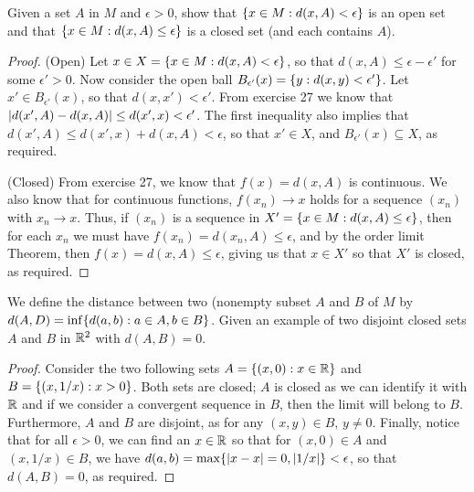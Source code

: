 \begin{exercise}{28}
Given a set $A$ in $M$ and $\epsilon>0$, show that $\{x\in M:d(x,A)<\epsilon\}$ is an open set and that $\{x\in M:d(x,A)\leq\epsilon\}$ is a closed set (and each contains $A$).
\end{exercise}
\begin{proof}
(Open)
Let $x\in X=\{x\in M:d(x,A)<\epsilon\}$, so that $d(x,A)\leq\epsilon-\epsilon'$ for some $\epsilon'>0$.
Now consider the open ball $B_{\epsilon'}(x)=\{y:d(x,y)<\epsilon'\}$.
Let $x'\in B_{\epsilon'}(x)$, so that $d(x,x')<\epsilon'$.
From exercise 27 we know that $\left\lvert d(x',A)-d(x,A)\right\rvert \leq d(x',x)<\epsilon'$.
The first inequality also implies that $d(x',A)\leq d(x',x)+d(x,A)<\epsilon$, so that $x'\in X$, and $B_{\epsilon'}(x)\subseteq X$, as required.

(Closed)
From exercise 27, we know that $f(x)=d(x,A)$ is continuous.
We also know that for continuous functions, $f(x_n)\to x$ holds for a sequence $(x_n)$ with $x_n\to x$.
Thus, if $(x_n)$ is a sequence in $X'=\{x\in M:d(x,A)\leq\epsilon\}$, then for each $x_n$ we must have $f(x_n)=d(x_n,A)\leq\epsilon$, and by the order limit Theorem, then $f(x)=d(x,A)\leq\epsilon$, giving us that $x\in X'$ so that $X'$ is closed, as required.
\end{proof} 

\begin{exercise}{32}
We define the distance between two (nonempty subset $A$ and $B$ of $M$ by $d(A,D)=\inf\{d(a,b):a\in A,b\in B\}$.
Given an example of two disjoint closed sets $A$ and $B$ in $\mathbb{R}^2$ with $d(A,B)=0$.
\end{exercise}
\begin{proof}
Consider the two following sets $A=\{(x,0):x\in\mathbb{R}\}$ and $B=\{(x,1/x):x>0\}$.
Both sets are closed;
$A$ is closed as we can identify it with $\mathbb{R}$ and if we consider a convergent sequence in $B$, then the limit will belong to $B$.
Furthermore, $A$ and $B$ are disjoint, as for any $(x,y)\in B$, $y\neq 0$.
Finally, notice that for all $\epsilon>0$, we can find an $x\in\mathbb{R}$ so that for $(x,0)\in A$ and $(x,1/x)\in B$, we have $d(a,b)=\max\{\left\lvert x-x\right\rvert=0,\left\lvert 1/x\right\rvert\}<\epsilon$, so that $d(A,B)=0$, as required.
\end{proof} 

